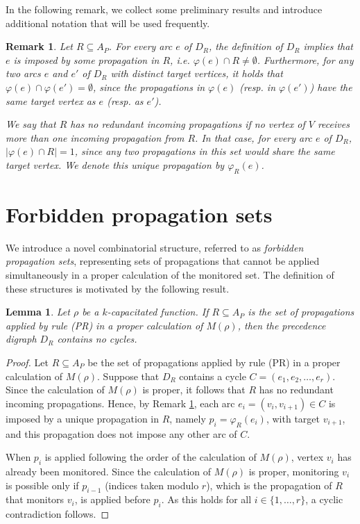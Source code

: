 \documentclass{article}
\newtheorem{lemma}{Lemma}
\newtheorem{remark}{Remark}
\begin{document}
In the following remark, we collect some preliminary results and introduce additional notation that will be used frequently.
\begin{remark}\label{remark.preliminary.results}
Let $R \subseteq A_P$.
For every arc $e$ of $D_R$, the definition of $D_R$ implies that $e$ is imposed by some propagation in $R$, i.e. $\varphi(e) \cap R \neq \emptyset$.
Furthermore, for any two arcs $e$ and $e'$ of $D_R$ with distinct target vertices, it holds that $\varphi(e) \cap \varphi(e') = \emptyset$, since the propagations in $\varphi(e)$ (resp. in $\varphi(e')$) have the same target vertex as $e$ (resp. as $e'$).

\noindent
We say that $R$ has no \emph{redundant incoming propagations} if no vertex of $V$ receives more than one incoming propagation from $R$.
In that case, for every arc $e$ of $D_R$, $|\varphi(e) \cap R| = 1$, since any two propagations in this set would share the same target vertex.
We denote this unique propagation by $\varphi_R(e)$.
\end{remark}

\section{Forbidden propagation sets}\label{sec.fps}

We introduce a novel combinatorial structure, referred to as \emph{forbidden propagation sets}, representing sets of propagations that cannot be applied simultaneously in a proper calculation of the monitored set.
The definition of these structures is motivated by the following result.

\begin{lemma}\label{lemma.DAG}
Let $\rho$ be a $k$-capacitated function.
If $R \subseteq A_P$ is the set of propagations applied by rule (PR) in a proper calculation of $M(\rho)$, then the precedence digraph $D_R$ contains no cycles.
\end{lemma}
\begin{proof}
Let $R \subseteq A_P$ be the set of propagations applied by rule (PR) in a proper calculation of $M(\rho)$.
Suppose that $D_R$ contains a cycle $C = (e_1, e_2, \dots, e_r)$.
Since the calculation of $M(\rho)$ is proper, it follows that $R$ has no redundant incoming propagations.
Hence, by Remark \ref{remark.preliminary.results}, each arc $e_i = (v_i, v_{i+1}) \in C$ is imposed by a unique propagation in $R$, namely $p_i = \varphi_R(e_i)$, with target $v_{i+1}$, and this propagation does not impose any other arc of $C$.

When $p_i$ is applied following the order of the calculation of $M(\rho)$, vertex $v_i$ has already been monitored.
Since the calculation of $M(\rho)$ is proper, monitoring $v_i$ is possible only if $p_{i-1}$ (indices taken modulo $r$), which is the propagation of $R$ that monitors $v_i$, is applied before $p_i$.
As this holds for all $i \in \{1,\ldots,r\}$, a cyclic contradiction follows.
\end{proof}
\end{document}
